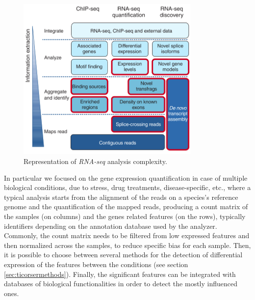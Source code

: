 \begin{figure}[h]
\centering
\includegraphics[width=9cm, keepaspectratio]{img/intro/rna-seqan.png}
\caption[RNA-seq analysis]{Representation of \textit{RNA-seq} analysis complexity. \cite{Pepke2009}}
\label{fig:rnaseqan}
\end{figure}


In particular we focused on the gene expression quantification in case of multiple biological conditions, due to stress, drug treatments, disease-specific, etc., where a typical analysis starts from the alignment of the reads on a species's reference genome and the quantification of the mapped reads, producing a count matrix of the samples (on columns) and the genes related features (on the rows), typically identifiers depending on the annotation database used by the analyzer.
Commonly, the count matrix needs to be filtered from low expressed features and then normalized across the samples, to reduce specific bias for each sample.
Then, it is possible to choose between several methods for the detection of differential expression of the features between the conditions (see section \ref{sec:ticorsermethods}).
Finally, the significant features can be integrated with databases of biological functionalities in order to detect the mostly influenced ones.

